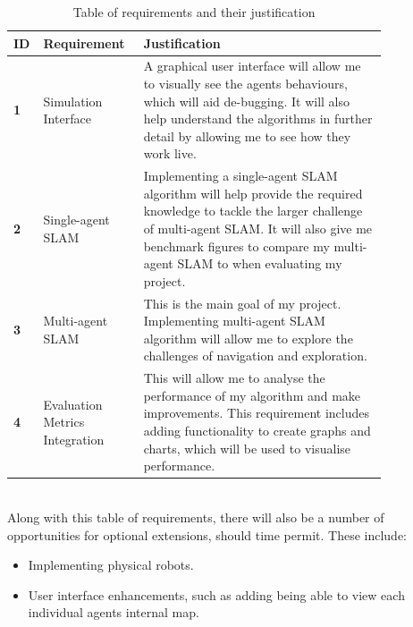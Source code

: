 \documentclass[12pt]{article}
\begin{document}
\begin{table}[H]
    \centering
    \begin{tabular}{|p{0.03\linewidth}|p{0.2\linewidth}|p{0.6\linewidth}|}
        \hline
        \textbf{ID} &
        \textbf{Requirement} &
        \textbf{Justification}\\
        \hline
        \textbf{1} &
        Simulation Interface &
        A graphical user interface will allow me to visually see the agents behaviours, which will aid de-bugging. It will
        also help understand the algorithms in further detail by allowing me to see how they work live.\\
        \hline
        \textbf{2} &
        Single-agent SLAM &
        Implementing a single-agent SLAM algorithm will help provide the required knowledge to tackle the larger challenge
        of multi-agent SLAM. It will also give me benchmark figures to compare my multi-agent SLAM to when evaluating my project.\\
        \hline
        \textbf{3} &
        Multi-agent SLAM &
        This is the main goal of my project. Implementing multi-agent SLAM algorithm will allow me to explore the challenges of
        navigation and exploration.\\
        \hline
        \textbf{4} &
        Evaluation Metrics Integration &
        This will allow me to analyse the performance of my algorithm and make improvements. This requirement includes adding
        functionality to create graphs and charts, which will be used to visualise performance.\\
        \hline
    \end{tabular}
    \caption{Table of requirements and their justification}\label{tab:requirements_table}
\end{table}\\

Along with this table of requirements, there will also be a number of opportunities for optional extensions, should time permit.
These include:
\begin{itemize}
    \item Implementing physical robots.
    \item User interface enhancements, such as adding being able to view each individual agents internal map.
\end{itemize}

\pagebreak
\end{document}

